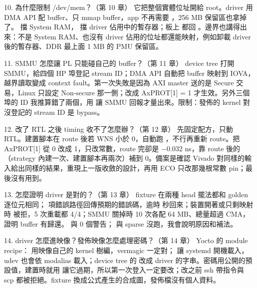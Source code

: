 \begin{qashort}{10. 為什麼限制 /dev/mem？（第 10 章）}
它把整個實體位址開給 root。driver 用 DMA API 配 buffer、只 mmap buffer，app 不再需要 ，256 MB 保留區也拿掉了。 擋 System RAM， 擋 driver 佔用中的暫存器；板上  都回 。邊界也講得出來：不是 System RAM、也沒有 driver 佔用的位址都還能映射，例如卸載 driver 後的暫存器、DDR 最上面 1 MB 的 PMU 保留區。
\end{qashort}

\begin{qashort}{11. SMMU 怎麼讓 PL 只能碰自己的 buffer？（第 11 章）}
device tree 打開 SMMU，給四個 HP 埠登記 stream ID；DMA API 自動把 buffer 映射到 IOVA，越界讀取變成 context fault。第一次失敗是因為 AXI master 送的是 Secure 交易，Linux 只設定 Non-secure 那一側；改成 AxPROT[1] = 1 才生效。另外三個埠的 ID 我推算錯了兩個，用  讓 SMMU 回報才量出來。限制：發佈的 kernel 對沒登記的 stream ID 是 bypass。
\end{qashort}

\begin{qashort}{12. 改了 RTL 之後 timing 收不了怎麼辦？（第 12 章）}
先固定配方，只動 RTL。建置腳本在 route 後若 WNS 小於 0，自動跑 ，不行再重新 route。把 AxPROT[1] 從 0 改成 1，只改常數，route 完卻是 $-$0.032 ns，靠 route 後的 （strategy 內建一次、建置腳本再兩次）補到 0。備案是確認 Vivado 對同樣的輸入給出同樣的結果，重現上一版收斂的設計，再用 ECO 只改那幾根常數 pin；最後沒有用到。
\end{qashort}

\begin{qashort}{13. 怎麼證明 driver 是對的？（第 13 章）}
fixture 在兩種 head 擺法都和 golden 逐位元相同；\errChecks{} 項錯誤路徑回傳預期的錯誤碼，逾時 \timeoutSec{} 秒回來；裝置開著或只剩映射時  被拒，5 次重載都 4/4；SMMU 關掉時 10 次各配 64 MB、總量超過 CMA，證明 buffer 有歸還。 與  0 個警告； 與 sparse 沒跑，我會說明原因和補法。
\end{qashort}

\begin{qashort}{14. driver 怎麼進映像？發佈映像怎麼處理密碼？（第 14 章）}
Yocto 的 module recipe： 用映像自己的 kernel 樹編，vermagic 一定對； 讓 systemd 開機載入，udev 也會依 modalias 載入；device tree 的  改成 driver 的字串。密碼用公開的預設值，建置時就用  讓它過期，所以第一次登入一定要改；改之前 ssh 帶指令與 scp 都被拒絕。fixture 換成公式產生的合成圖，發佈檔沒有個人資料。
\end{qashort}
